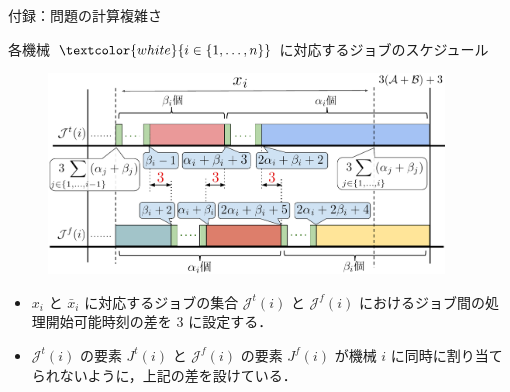 \documentclass[dvipdfmx]{beamer}
\begin{document}
    \begin{frame}{付録：問題の計算複雑さ}
      \begin{block}{各機械 ${\textcolor{white}{i \in \{1,\ldots,n\}}}$ に対応するジョブのスケジュール}
        \begin{figure}[h]
          \centering
          \includegraphics[width = 10.5cm]{figure/3SAT4.pdf}
        \end{figure}
      \end{block}
      \begin{itemize}
        \item $x_i$ と $\bar x_i$ に対応するジョブの集合 $\mathcal{J}^t(i)$ と $\mathcal{J}^f(i)$ におけるジョブ間の処理開始可能時刻の差を $3$ に設定する．
        \item $\mathcal{J}^t(i)$ の要素 $J^t(i)$ と $\mathcal{J}^f(i)$ の要素 $J^f(i)$ が機械 $i$ に同時に割り当てられないように，上記の差を設けている．
      \end{itemize}
    \end{frame}
\end{document}
